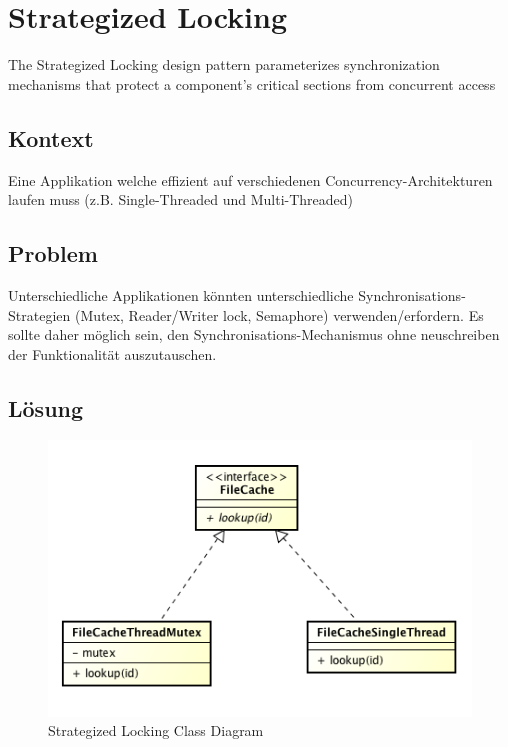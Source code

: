 \section{Strategized Locking}

The Strategized Locking design pattern parameterizes synchronization mechanisms that protect a component's critical sections from concurrent access

\subsection*{Kontext}

Eine Applikation welche effizient auf verschiedenen Concurrency-Architekturen laufen muss (z.B. Single-Threaded und Multi-Threaded)

\subsection*{Problem}

Unterschiedliche Applikationen könnten unterschiedliche Synchronisations-Strategien (Mutex, Reader/Writer lock, Semaphore) verwenden/erfordern. Es sollte daher möglich sein, den Synchronisations-Mechanismus ohne neuschreiben der Funktionalität auszutauschen.

\subsection*{Lösung}

\begin{figure}[H]
	\centering
	\includegraphics[width=12cm]{content/posa2/strategized-locking/images/Screen_Shot_2013-05-07.png}
	\caption{Strategized Locking Class Diagram}
\end{figure}

